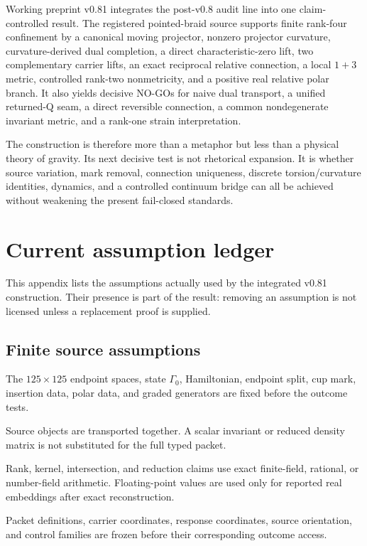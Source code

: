 \documentclass[12pt,a4paper,twoside]{article}
\begin{document}
Working preprint v0.81 integrates the post-v0.8 audit line into one claim-controlled result. The registered pointed-braid source supports finite rank-four confinement by a canonical moving projector, nonzero projector curvature, curvature-derived dual completion, a direct characteristic-zero lift, two complementary carrier lifts, an exact reciprocal relative connection, a local $1+3$ metric, controlled rank-two nonmetricity, and a positive real relative polar branch. It also yields decisive NO-GOs for naive dual transport, a unified returned-Q seam, a direct reversible connection, a common nondegenerate invariant metric, and a rank-one strain interpretation.

The construction is therefore more than a metaphor but less than a physical theory of gravity. Its next decisive test is not rhetorical expansion. It is whether source variation, mark removal, connection uniqueness, discrete torsion/curvature identities, dynamics, and a controlled continuum bridge can all be achieved without weakening the present fail-closed standards.

\appendix

\section{Current assumption ledger}

This appendix lists the assumptions actually used by the integrated v0.81 construction. Their presence is part of the result: removing an assumption is not licensed unless a replacement proof is supplied.

\subsection{Finite source assumptions}

\begin{description}[leftmargin=2.2em,style=nextline]
\item[S1: fixed source identity.] The $125\times125$ endpoint spaces, state $\Gamma_0$, Hamiltonian, endpoint split, cup mark, insertion data, polar data, and graded generators are fixed before the outcome tests.
\item[S2: typed transport.] Source objects are transported together. A scalar invariant or reduced density matrix is not substituted for the full typed packet.
\item[S3: exact arithmetic.] Rank, kernel, intersection, and reduction claims use exact finite-field, rational, or number-field arithmetic. Floating-point values are used only for reported real embeddings after exact reconstruction.
\item[S4: no retuning.] Packet definitions, carrier coordinates, response coordinates, source orientation, and control families are frozen before their corresponding outcome access.
\end{description}
\end{document}
